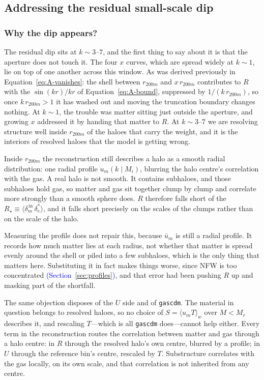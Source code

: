 \documentclass{article}
\begin{document}
\subsection{Addressing the residual small-scale dip}

\subsubsection{Why the dip appears?}
\label{sec:dip}

The residual dip sits at $k \sim 3$--$7$, and the first thing to say about it is
that the aperture does not touch it. The four $x$ curves, which are
spread widely at $k \sim 1$, lie on top of one another across this window. As was derived previously in Equation~\eqref{eq:A-vanishes}: the shell
between $r_{200m}$ and $x\,r_{200m}$ contributes to $R$ with the $\sin(kr)/kr$ of
Equation~\eqref{eq:A-bound}, suppressed by $1/(k\,r_{200m})$, so once
$k\,r_{200m} > 1$ it has washed out and moving the truncation boundary changes nothing. At $k \sim 1$, the
trouble was matter sitting just outside the aperture, and growing $x$ addressed it by
handing that matter to $R$. At $k \sim 3$--$7$ we are resolving structure well
inside $r_{200m}$ of the haloes that carry the weight, and it is the interiors of
resolved haloes that the model is getting wrong.

Inside $r_{200m}$ the reconstruction still describes a halo as a smooth radial distribution: one
radial profile $u_m(k \mid M_i)$, blurring the halo centre's correlation with the
gas. A real halo is not smooth. It contains subhaloes, and those subhaloes hold
gas, so matter and gas sit together clump by clump and correlate more strongly
than a smooth sphere does. $R$ therefore falls short of the $R_\star \equiv \langle \delta_m^{\mathrm{\,in}} \, \delta_e^* \rangle$, and it falls short precisely on the scales of the
clumps rather than on the scale of the halo.

Measuring the profile does not repair this, because $\bar u_m$ is still a radial
profile. It records how much matter lies at each radius, not whether that matter is spread evenly around the shell or piled into a few
subhaloes, which is the only thing that matters here. Substituting it in fact
makes things worse, since NFW is too concentrated
\textcolor{blue}{(Section~\ref{sec:profiles})}, and that error had been pushing
$R$ up and masking part of the shortfall.

The same objection disposes of the $U$ side and of \texttt{gascdm}. The material
in question belongs to resolved haloes, so no choice of $S = \langle u_m T
\rangle_w$ over $M < M_r$ describes it, and rescaling $T$---which is all
\texttt{gascdm} does---cannot help either. Every term in the reconstruction routes
the correlation between matter and gas through a halo centre: in $R$ through the
resolved halo's own centre, blurred by a profile; in $U$ through the reference
bin's centre, rescaled by $T$. Substructure correlates with the gas locally, on
its own scale, and that correlation is not inherited from any centre.
\end{document}
